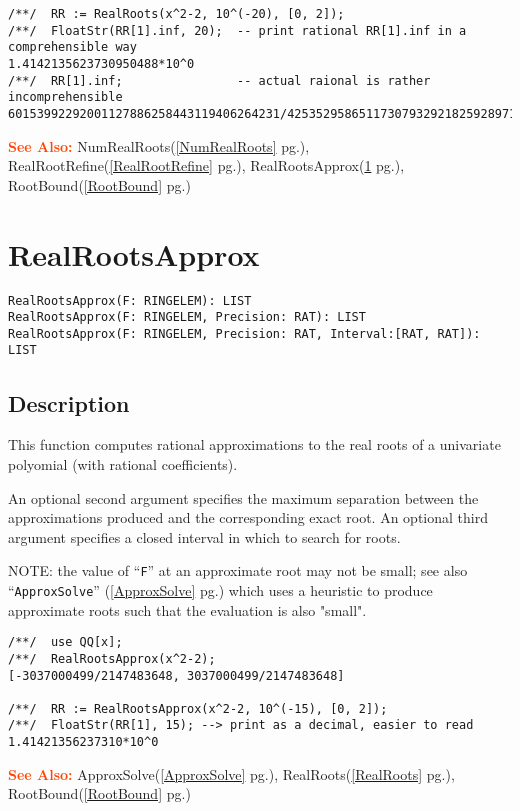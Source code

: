 \documentclass[a4paper]{mybook}
\newenvironment{command}{}{} %
\newcommand\SeeAlso{\par\textcolor{OrangeRed}{\textbf{\large See Also: }}}
\begin{document}
\begin{command}
\begin{Verbatim}[label=example, rulecolor=\color{PineGreen}, frame=single]
/**/  RR := RealRoots(x^2-2, 10^(-20), [0, 2]);
/**/  FloatStr(RR[1].inf, 20);  -- print rational RR[1].inf in a comprehensible way
1.4142135623730950488*10^0
/**/  RR[1].inf;                -- actual raional is rather incomprehensible
60153992292001127886258443119406264231/42535295865117307932921825928971026432
\end{Verbatim}


\SeeAlso %
  NumRealRoots(\ref{NumRealRoots} pg.\pageref{NumRealRoots}), 
    RealRootRefine(\ref{RealRootRefine} pg.\pageref{RealRootRefine}), 
    RealRootsApprox(\ref{RealRootsApprox} pg.\pageref{RealRootsApprox}), 
    RootBound(\ref{RootBound} pg.\pageref{RootBound})
\end{command} %

\section{RealRootsApprox}
\label{RealRootsApprox}
\begin{command} %


\begin{Verbatim}[label=syntax, rulecolor=\color{MidnightBlue},
frame=single]
RealRootsApprox(F: RINGELEM): LIST
RealRootsApprox(F: RINGELEM, Precision: RAT): LIST
RealRootsApprox(F: RINGELEM, Precision: RAT, Interval:[RAT, RAT]): LIST
\end{Verbatim}


\subsection*{Description}

This function computes rational approximations to the real roots of a
univariate polyomial (with rational coefficients).
\par 
An optional second argument specifies the maximum separation between
the approximations produced and the corresponding exact root.  An
optional third argument specifies a closed interval in which to search
for roots.
\par 
NOTE: the value of ``\verb&F&'' at an approximate root may not be small;
see also ``\verb&ApproxSolve&'' (\ref{ApproxSolve} pg.\pageref{ApproxSolve}) which uses a heuristic to produce approximate
roots such that the evaluation is also "small".
\begin{Verbatim}[label=example, rulecolor=\color{PineGreen}, frame=single]
/**/  use QQ[x];
/**/  RealRootsApprox(x^2-2);
[-3037000499/2147483648, 3037000499/2147483648]

/**/  RR := RealRootsApprox(x^2-2, 10^(-15), [0, 2]);
/**/  FloatStr(RR[1], 15); --> print as a decimal, easier to read
1.41421356237310*10^0
\end{Verbatim}


\SeeAlso %
  ApproxSolve(\ref{ApproxSolve} pg.\pageref{ApproxSolve}), 
    RealRoots(\ref{RealRoots} pg.\pageref{RealRoots}), 
    RootBound(\ref{RootBound} pg.\pageref{RootBound})
\end{command} %
\end{document}
